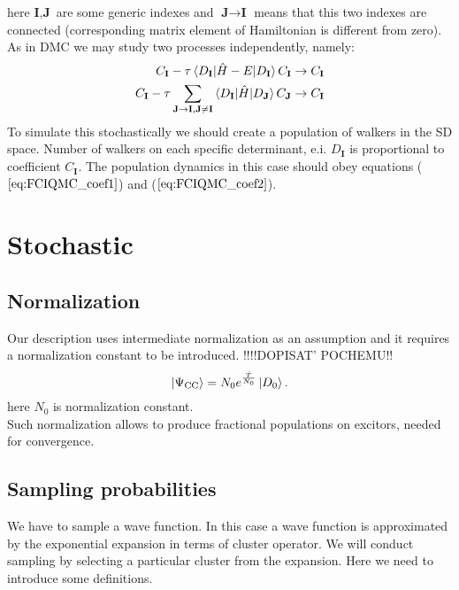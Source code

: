 \documentclass[twoside,english]{uiofysmaster}
\theoremstyle{definition}
\begin{document}
here $\textbf{I}, \textbf{J}$ are some generic indexes and $\textbf{J}\rightarrow \textbf{I}$ means that this two indexes are connected (corresponding matrix element of Hamiltonian is different from zero).
As in DMC we may study two processes independently, namely:
\begin{align}
C_{\textbf{I}} - \tau \braket{D_{\textbf{I}}|\hat{H}-E|D_{\textbf{I}}}C_{\textbf{I}} \rightarrow C_{\textbf{I}}\\\label{eq:FCIQMC_coef1}
C_{\textbf{I}} - \tau \sum_{\textbf{J}\rightarrow \textbf{I},\textbf{J}\neq \textbf{I} }  \braket{D_{\textbf{I}}|\hat{H}|D_{\textbf{J}}}C_{\textbf{J}} \rightarrow C_{\textbf{I}}\\\label{eq:FCIQMC_coef2}
\end{align}
To simulate this stochastically we should create a population of walkers in the SD space. Number of walkers on each specific determinant, e.i. $D_{\textbf{I}}$ is proportional to coefficient $C_{\textbf{I}}$. The population dynamics in this case should obey equations ($\ref{eq:FCIQMC_coef1}$) and ($\ref{eq:FCIQMC_coef2}$).




\chapter{Stochastic}
\section{Normalization}
Our description uses intermediate normalization as an assumption and it requires a normalization constant to be introduced. 
!!!!DOPISAT' POCHEMU!!
\begin{equation}
\ket{\Psi_{\text{CC}}}=N_0 e^{\frac{\hat{T}}{N_0}} \ket{D_0}.
\end{equation}
here $N_0$ is normalization constant.\\
Such normalization allows to produce fractional populations on excitors, needed for convergence.
\section{Sampling probabilities}

We have to sample a wave function. In this case a wave function is approximated by the exponential expansion in terms of cluster operator. We will conduct sampling by selecting a particular cluster from the expansion. Here we need to introduce some definitions.\\
\end{document}
